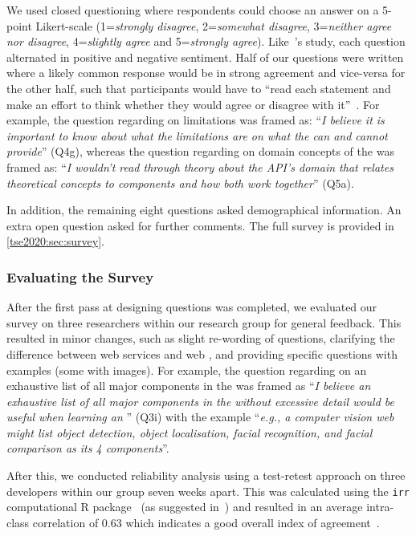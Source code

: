  We used closed questioning where respondents could choose an answer on a 5-point Likert-scale (1=\textit{strongly disagree}, 2=\textit{somewhat disagree}, 3=\textit{neither agree nor disagree}, 4=\textit{slightly agree} and 5=\textit{strongly agree}).  Like~\citeauthor{Brooke:1996ua}'s study, each question alternated in positive and negative sentiment. Half of our questions were written where a likely common response would be in strong agreement and vice-versa for the other half, such that participants would have to ``read each statement and make an effort to think whether they would agree or disagree with it''~\citep{Brooke:1996ua}. For example, the question regarding  on  limitations was framed as: ``\textit{I believe it is important to know about what the limitations are on what the  can and cannot provide}'' (Q4g), whereas the question regarding  on domain concepts of the  was framed as: ``\textit{I wouldn't read through theory about the API's domain that relates theoretical concepts to  components and how both work together}'' (Q5a). 
 
 In addition, the remaining eight questions asked demographical information. An extra open question asked for further comments. The full survey is provided in \cref{tse2020:sec:survey}.

\subsubsection{Evaluating the Survey}
\label{tse2020:sec:validation:survey:eval}

After the first pass at designing questions was completed, we evaluated our survey on three researchers within our research group for general feedback. This resulted in minor changes, such as slight re-wording of questions, clarifying the difference between web services and web , and providing specific questions with examples (some with images). For example, the question regarding  on an exhaustive list of all major components in the  was framed as ``\textit{I believe an exhaustive list of all major components in the  without excessive detail would be useful when learning an }'' (Q3i) with the example ``\textit{e.g., a computer vision web  might list object detection, object localisation, facial recognition, and facial comparison as its 4 components}''.

After this, we conducted reliability analysis using a test-retest approach on three developers within our group seven weeks apart.  This was calculated using the \texttt{irr} computational R package~\citep{Gamer:tj} (as suggested in~\citep{Hallgren:2012kt}) and  resulted in an average intra-class correlation of 0.63 which indicates a good overall index of agreement~\citep{cicchetti1994guidelines}.

